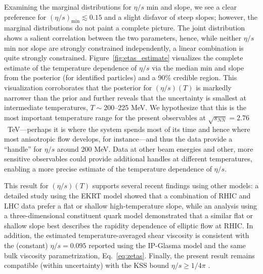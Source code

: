 \documentclass[aps,prc,reprint,amsmath,nofootinbib,noeprint]{revtex4-1}
\newcommand{\sqrts}{\sqrt{s_{NN}}}
\begin{document}
Examining the marginal distributions for $\eta/s$ min and slope, we see a clear preference for $(\eta/s)_\text{min} \lesssim 0.15$ and a slight disfavor of steep slopes;
however, the marginal distributions do not paint a complete picture.
The joint distribution shows a salient correlation between the two parameters, hence, while neither $\eta/s$ min nor slope are strongly constrained independently, a linear combination is quite strongly constrained.
Figure~\ref{fig:etas_estimate} visualizes the complete estimate of the temperature dependence of $\eta/s$ via the median min and slope from the posterior (for identified particles) and a 90\% credible region.
This visualization corroborates that the posterior for $(\eta/s)(T)$ is markedly narrower than the prior and further reveals that the uncertainty is smallest at intermediate temperatures, $T \sim {}$200--225 MeV.
We hypothesize that this is the most important temperature range for the present observables at $\sqrts = 2.76$~TeV---perhaps it is where the system spends most of its time and hence where most anisotropic flow develops, for instance---and thus the data provide a ``handle'' for $\eta/s$ around 200 MeV.
Data at other beam energies and other, more sensitive observables could provide additional handles at different temperatures, enabling a more precise estimate of the temperature dependence of $\eta/s$.

This result for $(\eta/s)(T)$ supports several recent findings using other models:
a detailed study using the EKRT model \cite{Niemi:2015qia} showed that a combination of RHIC and LHC data prefer a flat or shallow high-temperature slope, while an analysis using a three-dimensional constituent quark model \cite{Denicol:2015nhu} demonstrated that a similar flat or shallow slope best describes the rapidity dependence of elliptic flow at RHIC.
In addition, the estimated temperature-averaged shear viscosity is consistent with the (constant) $\eta/s = 0.095$ reported \cite{Ryu:2015vwa} using the IP-Glasma model and the same bulk viscosity parametrization, Eq.~\eqref{eq:zetas}.
Finally, the present result remains compatible (within uncertainty) with the KSS bound $\eta/s \geq 1/4\pi$ \cite{Danielewicz:1984ww, Policastro:2001yc, Kovtun:2004de}.

\end{document}
